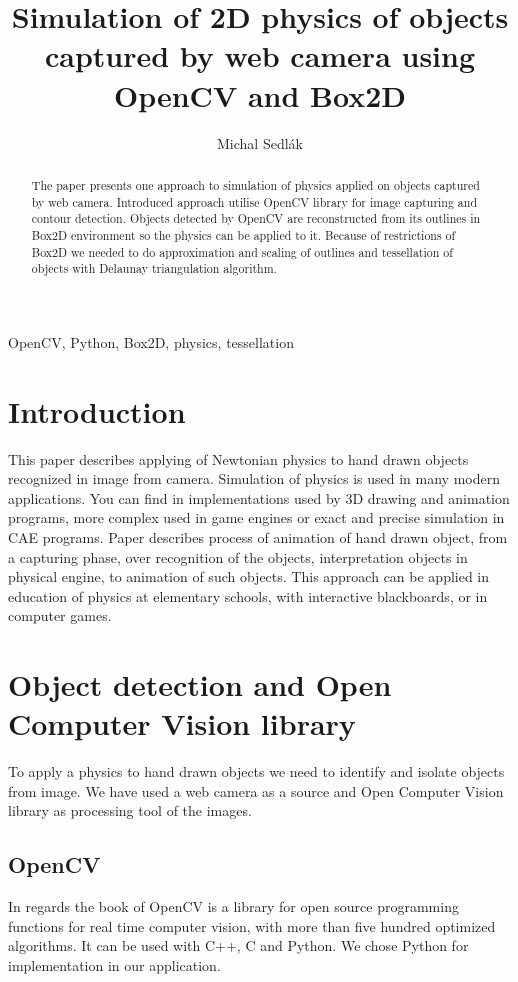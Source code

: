 \documentclass{ifacconf}
\begin{document}
\begin{frontmatter}
\title{Simulation of 2D physics of objects captured by web camera using OpenCV
and Box2D}
\author[Bratislava]{Michal Sedlák}
\address[Bratislava]{Faculty of Electrical Engineering and Information
Technology, Slovak University of Technology, Ilkovičova 3, 812 19 Bratislava,
Slovakia
\\
(e-mail: michal.sedlak@stuba.sk)}
\begin{abstract}
The paper presents one approach to simulation of physics applied on objects
captured by web camera. Introduced approach utilise OpenCV library for image
capturing and contour detection. Objects detected by OpenCV are reconstructed
from its outlines in Box2D environment so the physics can be applied to it.
Because of restrictions of Box2D we needed to do approximation and scaling of
outlines and tessellation of objects with Delaunay triangulation algorithm.
\end{abstract}
\begin{keyword}
OpenCV, Python, Box2D, physics, tessellation
\end{keyword}
\end{frontmatter}

\section{Introduction}
This paper describes applying of Newtonian physics to hand drawn objects
recognized in image from camera. Simulation of physics is used in many modern
applications. You can find in implementations used by 3D drawing and animation
programs, more complex used in game engines or exact and precise simulation in
CAE programs. Paper describes process of animation of hand drawn object, from a
capturing phase, over recognition of the objects, interpretation objects in
physical engine, to animation of such objects. This approach can be applied in
education of physics at elementary schools, with interactive blackboards, or in
computer games.

\section{Object detection and Open Computer Vision library}
To apply a physics to hand drawn objects we need to identify and isolate
objects from image. We have used a web camera as a source and Open Computer
Vision library as processing tool of the images.

\subsection{OpenCV}
In regards the book of \cite{OpenCV} OpenCV  is a library for open source
programming functions for real time computer vision, with more than five hundred
optimized algorithms. It can be used with C++, C and Python. We chose Python for
implementation in our application.
\end{document}
